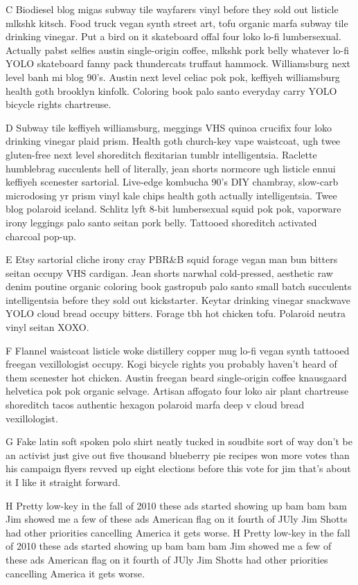 C Biodiesel blog  migas subway tile wayfarers vinyl before they sold out listicle mlkshk kitsch. Food truck vegan synth street art, tofu organic marfa subway tile drinking vinegar. Put a bird on it skateboard offal four loko lo-fi lumbersexual. Actually pabst selfies austin single-origin coffee, mlkshk pork belly whatever lo-fi YOLO skateboard fanny pack thundercats truffaut hammock. Williamsburg next level banh mi blog 90's. Austin next level celiac pok pok, keffiyeh williamsburg health goth brooklyn kinfolk. Coloring book palo santo everyday carry YOLO bicycle rights chartreuse.

D Subway tile keffiyeh williamsburg, meggings VHS quinoa crucifix four loko drinking vinegar plaid prism. Health goth church-key vape waistcoat, ugh twee gluten-free next level shoreditch flexitarian tumblr intelligentsia. Raclette humblebrag succulents hell of literally, jean shorts normcore ugh listicle ennui keffiyeh scenester sartorial. Live-edge kombucha 90's DIY chambray, slow-carb microdosing yr prism vinyl kale chips health goth actually intelligentsia. Twee blog polaroid iceland. Schlitz lyft 8-bit lumbersexual squid pok pok, vaporware irony leggings palo santo seitan pork belly. Tattooed shoreditch activated charcoal pop-up.

E Etsy sartorial cliche irony cray PBR&B squid forage vegan man bun bitters seitan occupy VHS cardigan. Jean shorts narwhal cold-pressed, aesthetic raw denim poutine organic coloring book gastropub palo santo small batch succulents intelligentsia before they sold out kickstarter. Keytar drinking vinegar snackwave YOLO cloud bread occupy bitters. Forage tbh hot chicken tofu. Polaroid neutra vinyl seitan XOXO.

F Flannel waistcoat listicle woke distillery copper mug lo-fi vegan synth tattooed freegan vexillologist occupy. Kogi bicycle rights you probably haven't heard of them scenester hot chicken. Austin freegan beard single-origin coffee knausgaard helvetica pok pok organic selvage. Artisan affogato four loko air plant chartreuse shoreditch tacos authentic hexagon polaroid marfa deep v cloud bread vexillologist.

G Fake latin soft spoken polo shirt neatly tucked in soudbite sort of way don't be an activist just give out five thousand blueberry pie recipes won more votes than his campaign flyers revved up eight elections before this vote for jim that's about it I like it straight forward.

H Pretty low-key in the fall of 2010 these ads started showing up bam bam bam Jim showed me a few of these ads American flag on it fourth of JUly Jim Shotts had other priorities cancelling America it gets worse. H Pretty low-key in the fall of 2010 these ads started showing up bam bam bam Jim showed me a few of these ads American flag on it fourth of JUly Jim Shotts had other priorities cancelling America it gets worse. 

